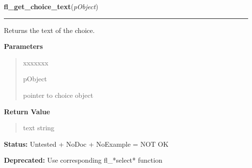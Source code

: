     \label{xformslib:library:fl_get_choice_text}

    \vspace{0.5ex}

\hspace{.8\funcindent}\begin{boxedminipage}{\funcwidth}

    \raggedright \textbf{fl\_get\_choice\_text}(\textit{pObject})

    \vspace{-1.5ex}

    \rule{\textwidth}{0.5\fboxrule}
\setlength{\parskip}{2ex}
    Returns the text of the choice.

\setlength{\parskip}{1ex}
      \textbf{Parameters}
      \vspace{-1ex}

      \begin{quote}
        \begin{Ventry}{xxxxxxx}

          \item[pObject]

          pointer to choice object

        \end{Ventry}

      \end{quote}

      \textbf{Return Value}
    \vspace{-1ex}

      \begin{quote}
      text string

      \end{quote}

\textbf{Status:} Untested + NoDoc + NoExample = NOT OK



\textbf{Deprecated:} Use corresponding fl\_*select* function



    \end{boxedminipage}

    \label{xformslib:library:fl_set_choice_fontsize}

    \vspace{0.5ex}

